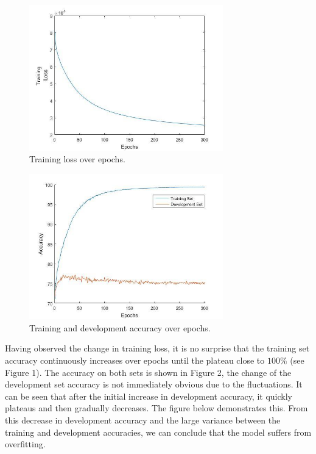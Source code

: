 \documentclass{article} %
\begin{document}
\begin{figure}[H]
\centering
\includegraphics[width=0.75\textwidth]{graphics/tloss.jpg}
\caption{Training loss over epochs.}
\end{figure}

\begin{figure}[H]
\centering
\includegraphics[width=0.75\textwidth]{graphics/tdloss.jpg}
\caption{Training and development accuracy over epochs.}
\end{figure}

Having observed the change in training loss, it is no surprise that the training set accuracy continuously increases over epochs until the plateau close to $100\%$ (see Figure 1). The accuracy on both sets is shown in Figure 2, the change of the development set accuracy is not immediately obvious due to the fluctuations. It can be seen that after the initial increase in development accuracy, it quickly plateaus and then gradually decreases. The figure below demonstrates this. From this decrease in development accuracy and the large variance between the training and development accuracies, we can conclude that the model suffers from overfitting.
\end{document}

